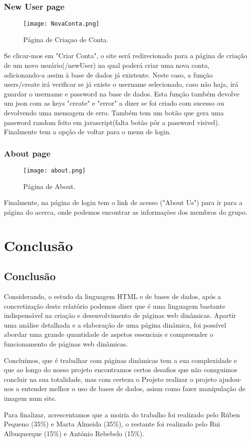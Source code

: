 \documentclass[11pt,openright,twoside]{report}
\begin{document}
\section{New User page}
\begin{figure}
 \center
 \texttt{[image: NovaConta.png]}
 \caption{Página de Criaçao de Conta.}
 \label{bse}
\end{figure}

Se clicar-mos em "Criar Conta", o site será redirecionado para a página de criação de um novo usuário(/newUser) na qual poderá criar uma nova conta, adicionando-a assim à base de dados já existente. Neste caso, a função users/create irá verificar se já existe o username selecionado, caso não haja, irá guardar o username e password na base de dados. Esta função também devolve um json com as keys "create" e "error" a dizer se foi criado com sucesso ou devolvendo uma mensagem de erro. Também tem um botão que gera uma password random feito em javascript(falta botão pôr a password visivel). Finalmente tem a opção de voltar para o menu de login.
\smallskip

\section{About page}
\begin{figure}
 \center
 \texttt{[image: about.png]}
 \caption{Página de About.}
 \label{bse}
\end{figure}

Finalmente, na página de login tem o link de acesso ("About Us") para ir para a página do acerca, onde podemos encontrar as informações dos membros do grupo.
\smallskip

\part{Conclusão}

\chapter{Conclusão}
Considerando, o estudo da linguagem HTML e de bases de dados, após a concretização deste relatório podemos dizer que é uma linguagem bastante indispensável na criação e desenvolvimento de páginas web dinâmicas. Apartir uma análise detalhada e a elaboração de uma página dinâmica, foi possível abordar uma grande quantidade de aspetos essenciais e compreender o funcionamento de páginas web dinâmicas.
\smallskip

Concluímos, que é trabalhar com páginas dinâmicas tem a sua complexidade e que ao longo do nosso projeto encontramos certos desafios que não consguimos concluir na sua totalidade, mas com certeza o Projeto realizar o projeto ajudou-nos a entender melhor o uso de bases de dados, asism como fazer manipulação de imagem num site.
\smallskip

Para finalizar, acrescentamos que a moiria do trabalho foi realizado pelo Rúben Pequeno (35\%) e Marta Almeida (35\%), o restante foi realizado pelo Rui Albuquerque (15\%) e António Rebebelo (15\%).



\end{document}
